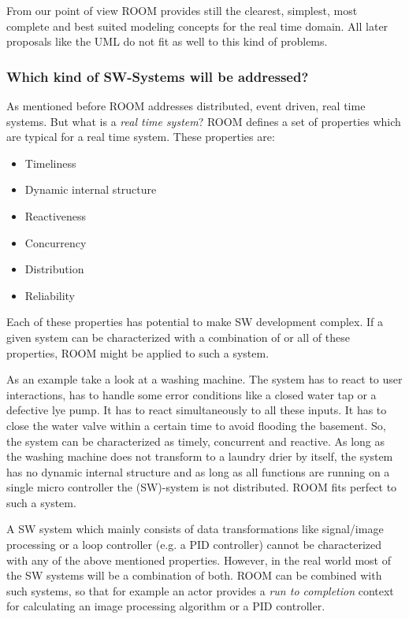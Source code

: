 From our point of view ROOM provides still the clearest, simplest, most complete and best suited modeling
concepts for the real time domain. All later proposals like the UML do not fit as well to this kind of problems.
 

\subsubsection*{Which kind of SW-Systems will be addressed?}

As mentioned before ROOM addresses distributed, event driven, real time systems.
But what is a \emph{real time system}? ROOM defines a set of properties
which are typical for a real time system. These properties are:

\begin{itemize}
\item Timeliness
\item Dynamic internal structure
\item Reactiveness
\item Concurrency
\item Distribution
\item Reliability
\end{itemize}

Each of these properties has potential to make SW development complex. If a given system can be characterized
with a combination of or all of these properties, ROOM might be applied to such a system.  

As an example take a look at a washing machine. The system has to react to user interactions, has to handle
some error conditions like a closed water tap or a defective lye pump. It has to react simultaneously to all these inputs.
It has to close the water valve within a certain time to avoid flooding the basement. 
So, the system can be characterized as timely, concurrent and reactive. As long as the washing machine does
not transform to a laundry drier by itself, the system has no dynamic internal structure and as long as all functions
are running on a single micro controller the (SW)-system is not distributed. 
ROOM fits perfect to such a system.

A SW system which mainly consists of data transformations like signal/image processing or a loop controller
(e.g. a PID controller) cannot be characterized with any of the above mentioned properties. However, in the real
world most of the SW systems will be a combination of both. ROOM can be combined with such systems, so that for
example an actor provides a \emph{run to completion} context for calculating an image processing algorithm or a
PID controller.  

